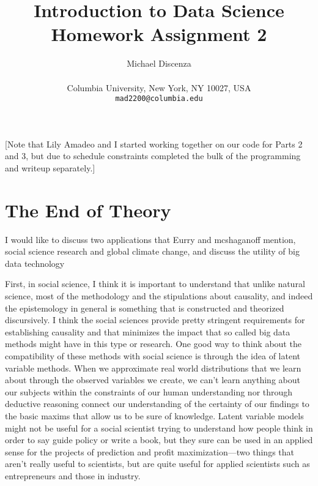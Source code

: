 \documentclass{article}
\title{Introduction to Data Science\\Homework Assignment 2}
\author{
Michael Discenza\\\\
Columbia University, New York, NY 10027, USA \\
\texttt{mad2200@columbia.edu}
}
\begin{document}
\maketitle



[Note that Lily Amadeo and I started working together on our code for Parts 2 and 3, but due to schedule constraints completed the bulk of the programming and writeup separately.]

\section{The End of Theory}

I would like to discuss two applications that Eurry and mcshaganoff mention, social science research and global climate change, and discuss the utility of big data technology

First, in social science, I think it is important to understand that unlike natural science, most of the methodology and the stipulations about causality, and indeed the epistemology in general is something that is constructed and theorized discursively.  I think the social sciences provide pretty stringent requirements for establishing causality and that minimizes the impact that so called big data methods might have in this type or research.  One good way to think about the compatibility of these methods with social science is through the idea of latent variable methods.  When we approximate real world distributions that we learn about through the observed variables we create, we can’t learn anything about our subjects within the constraints of our human understanding nor through deductive reasoning connect our understanding of the certainty of our findings to the basic maxims that allow us to be sure of knowledge.  Latent variable models might not be useful for a social scientist trying to understand how people think in order to say guide policy or write a book, but they sure can be used in an applied sense for the projects of prediction and profit maximization—two things that aren’t really useful to scientists, but are quite useful for applied scientists such as entrepreneurs and those in industry.  
\end{document}
